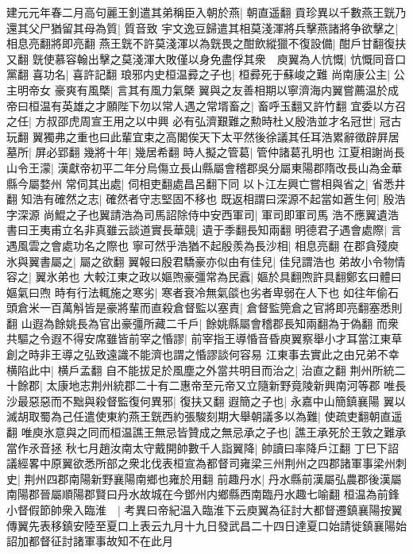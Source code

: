 建元元年春二月高句麗王釗遣其弟稱臣入朝於燕|{
	朝直遥翻}
貢珍異以千數燕王皝乃還其父尸猶留其母為質|{
	質音致}
宇文逸豆歸遣其相莫淺渾將兵擊燕諸將争欲擊之|{
	相息亮翻將即亮翻}
燕王皝不許莫淺渾以為皝畏之酣飲縱獵不復設備|{
	酣戶甘翻復扶又翻}
皝使慕容翰出擊之莫淺渾大敗僅以身免盡俘其衆　庾翼為人忼慨|{
	忼慨同音口黨翻}
喜功名|{
	喜許記翻}
琅邪内史桓温彛之子也|{
	桓彛死于蘇峻之難}
尚南康公主|{
	公主明帝女}
豪爽有風槩|{
	言其有風力氣槩}
翼與之友善相期以寧濟海内翼嘗薦温於成帝曰桓温有英雄之才願陛下勿以常人遇之常壻畜之|{
	畜呼玉翻又許竹翻}
宜委以方召之任|{
	方叔邵虎周宣王用之以中興}
必有弘濟艱難之勲時杜乂殷浩並才名冠世|{
	冠古玩翻}
翼獨弗之重也曰此輩宜束之高閣俟天下太平然後徐議其任耳浩累辭徵辟屛居墓所|{
	屏必郢翻}
幾將十年|{
	幾居希翻}
時人擬之管葛|{
	管仲諸葛孔明也}
江夏相謝尚長山令王濛|{
	漢獻帝初平二年分烏傷立長山縣屬會稽郡吳分屬東陽郡隋改長山為金華縣今屬婺州}
常伺其出處|{
	伺相吏翻處昌呂翻下同}
以卜江左興亡嘗相與省之|{
	省悉井翻}
知浩有確然之志|{
	確然者守志堅固不移也}
既返相謂曰深源不起當如蒼生何|{
	殷浩字深源}
尚鯤之子也翼請浩為司馬詔除侍中安西軍司|{
	軍司即軍司馬}
浩不應翼遺浩書曰王夷甫立名非真雖云談道實長華競|{
	遺于季翻長知兩翻}
明德君子遇會處際|{
	言遇風雲之會處功名之際也}
寧可然乎浩猶不起殷羨為長沙相|{
	相息亮翻}
在郡貪殘庾氷與翼書屬之|{
	屬之欲翻}
翼報曰殷君驕豪亦似由有佳兒|{
	佳兒謂浩也}
弟故小令物情容之|{
	翼氷弟也}
大較江東之政以嫗喣豪彊常為民蠧|{
	嫗於具翻喣許具翻鄭玄曰體曰嫗氣曰喣}
時有行法輒施之寒劣|{
	寒者衰冷無氣燄也劣者卑弱在人下也}
如往年偷石頭倉米一百萬斛皆是豪將輩而直殺倉督監以塞責|{
	倉督監筦倉之官將即亮翻塞悉則翻}
山遐為餘姚長為官出豪彊所藏二千戶|{
	餘姚縣屬會稽郡長知兩翻為于偽翻}
而衆共驅之令遐不得安席雖皆前宰之惛謬|{
	前宰指王導惛音昏庾翼察舉小才耳當江東草創之時非王導之弘致遠識不能濟也謂之惛謬談何容易}
江東事去實此之由兄弟不幸横陷此中|{
	横戶孟翻}
自不能拔足於風塵之外當共明目而治之|{
	治直之翻}
荆州所統二十餘郡|{
	太康地志荆州統郡二十有二惠帝至元帝又立隨新野竟陵新興南河等郡}
唯長沙最惡惡而不黜與殺督監復何異邪|{
	復扶又翻}
遐簡之子也|{
	永嘉中山簡鎮襄陽}
翼以滅胡取蜀為己任遣使東約燕王皝西約張駿刻期大舉朝議多以為難|{
	使疏吏翻朝直遥翻}
唯庾氷意與之同而桓温譙王無忌皆贊成之無忌承之子也|{
	譙王承死於王敦之難承當作氶音拯}
秋七月趙汝南太守戴開帥數千人詣翼降|{
	帥讀曰率降戶江翻}
丁巳下詔議經畧中原翼欲悉所部之衆北伐表桓宣為都督司雍梁三州荆州之四郡諸軍事梁州刺史|{
	荆州四郡南陽新野襄陽南鄉也雍於用翻}
前趣丹水|{
	丹水縣前漢屬弘農郡後漢屬南陽郡晉屬順陽郡賢曰丹水故城在今鄧州内鄉縣西南臨丹水趣七喻翻}
桓温為前鋒小督假節帥衆入臨淮　|{
	考異曰帝紀温入臨淮下云庾翼為征討大都督遷鎮襄陽按翼傳翼先表移鎮安陸至夏口上表云九月十九日發武昌二十四日達夏口始請徙鎮襄陽始詔加都督征討諸軍事故知不在此月}
